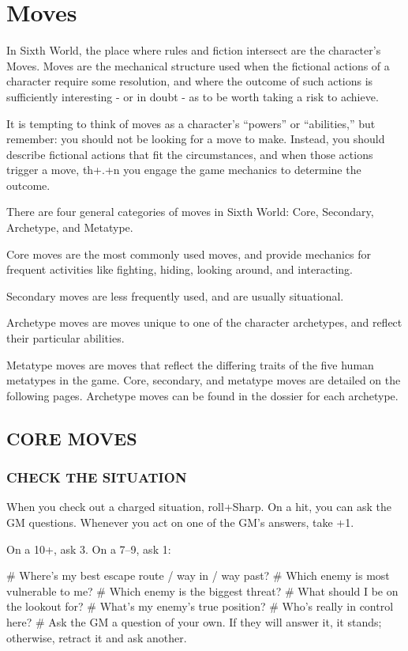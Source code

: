 \chapter{Moves} \label{moves}

In Sixth World, the place where rules and fiction intersect are the character’s Moves. Moves are the mechanical structure used when the fictional actions of a character require some resolution, and where the outcome of such actions is sufficiently interesting - or in doubt - as to be worth taking a risk to achieve.

It is tempting to think of moves as a character’s “powers” or “abilities,” but remember: you should not be looking for a move to make. Instead, you should describe fictional actions that fit the circumstances, and when those actions trigger a move, th+.+n you engage the game mechanics to determine the outcome.

There are four general categories of moves in Sixth World: Core, Secondary, Archetype, and Metatype.

Core moves are the most commonly used moves, and provide mechanics for frequent activities like fighting, hiding, looking around, and interacting.

Secondary moves are less frequently used, and are usually situational.

Archetype moves are moves unique to one of the character archetypes, and reflect their particular abilities.

Metatype moves are moves that reflect the differing traits of the five human metatypes in the game. Core, secondary, and metatype moves are detailed on the following pages. Archetype moves can be found in the dossier for each archetype.

\section{CORE MOVES}

\subsection{CHECK THE SITUATION}
When you check out a charged situation, roll+Sharp. On a hit, you can ask the GM questions. Whenever you act on one of the GM’s answers, take +1.

On a 10+, ask 3. On a 7–9, ask 1:

\begin{easylist}
# Where’s my best escape route / way in / way past?
# Which enemy is most vulnerable to me?
# Which enemy is the biggest threat?
# What should I be on the lookout for?
# What’s my enemy’s true position?
# Who’s really in control here?
# Ask the GM a question of your own. If they will answer it, it stands; otherwise, retract it and ask another.
\end{easylist}


